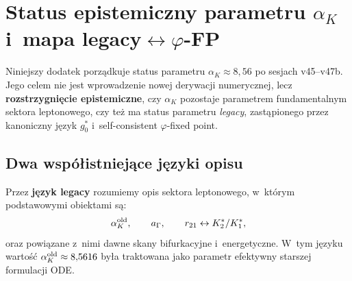 \section{Status epistemiczny parametru $\alpha_K$ i~mapa
  legacy$\leftrightarrow\varphi$-FP}%
\label{app:Z-alphaK}

Niniejszy dodatek porz\k{a}dkuje status parametru
$\alpha_K \approx 8{,}56$ po sesjach v45--v47b.
Jego celem nie jest wprowadzenie nowej derywacji numerycznej,
lecz \textbf{rozstrzygni\k{e}cie epistemiczne}, czy
$\alpha_K$ pozostaje parametrem fundamentalnym sektora leptonowego,
czy te\.z ma status parametru \emph{legacy},
zast\k{a}pionego przez kanoniczny j\k{e}zyk
$g_0^*$ i~self-consistent $\varphi$-fixed point.

\medskip
\noindent{}
\medskip

\subsection{Dwa wsp\'o\l{}istniej\k{a}ce j\k{e}zyki opisu}
\label{app:Z-two-languages}

\begin{definition}\label{def:Z-legacy}
Przez \textbf{j\k{e}zyk legacy} rozumiemy opis sektora leptonowego,
w~kt\'orym podstawowymi obiektami s\k{a}:
\begin{equation}
  \alpha_K^{\rm old}, \qquad a_\Gamma, \qquad
  r_{21} \leftrightarrow K_2^*/K_1^*,
\end{equation}
oraz powi\k{a}zane z~nimi dawne skany bifurkacyjne i~energetyczne.
W~tym j\k{e}zyku warto\'s\'c
$\alpha_K^{\rm old} \approx 8{,}5616$
by\l{}a traktowana jako parametr efektywny starszej formulacji ODE.
\end{definition}

